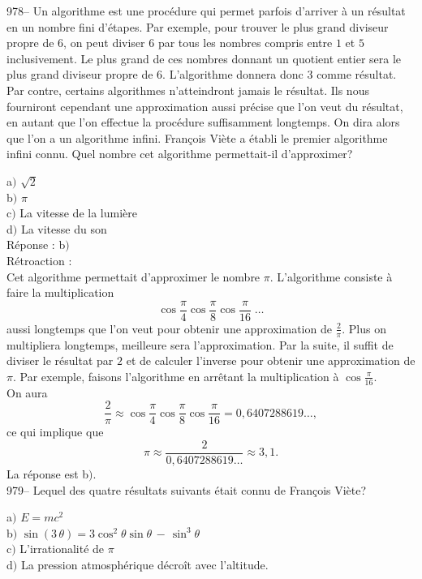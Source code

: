 ﻿\documentclass[letterpaper, 12pt]{article}
\begin{document}
978-- Un algorithme est une proc\'edure qui permet parfois d'arriver
\`a un r\'esultat en un nombre fini d'\'etapes. Par exemple, pour
trouver le plus grand diviseur propre de $6$, on peut diviser $6$
par tous les nombres compris entre $1$ et $5$ inclusivement. Le plus
grand de ces nombres donnant un quotient entier sera le plus grand
diviseur propre de $6$. L'algorithme donnera donc $3$ comme
r\'esultat. Par contre, certains algorithmes n'atteindront jamais le
r\'esultat. Ils nous fourniront cependant une approximation aussi
pr\'ecise que l'on veut du r\'esultat, en autant que l'on effectue
la proc\'edure suffisamment longtemps. On dira alors que l'on a un
algorithme infini. Fran\c cois Vi\`ete a \'etabli le premier
algorithme infini connu. Quel nombre cet algorithme permettait-il
d'approximer?

a$)$ $\sqrt2$ \\
b$)$ $\pi$ \\
c$)$ La vitesse de la lumi\`ere \\
d$)$ La vitesse du son\\

R\'eponse : b$)$\\

R\'etroaction : \\
Cet algorithme permettait d'approximer le nombre $\pi$. L'algorithme
consiste \`a faire la multiplication
$$\displaystyle{\cos\frac{\pi}4\cos\frac{\pi}8\cos\frac{\pi}{16}\;\ldots}$$
aussi longtemps que l'on veut pour obtenir une approximation de
$\frac2{\pi}$. Plus on multipliera longtemps, meilleure sera
l'approximation. Par la suite, il suffit de diviser le r\'esultat
par $2$ et de calculer l'inverse
pour obtenir une approximation de $\pi$. Par exemple, faisons l'algorithme
en arr\^etant la multiplication \`a $\cos\frac{\pi}{16}$.\\
On aura
$$
\displaystyle{\frac2{\pi}}  \approx
\displaystyle{\cos\frac{\pi}4\cos\frac{\pi}8\cos\frac{\pi}{16}}
                               =     0,640 728 861 9\ldots,
$$
ce qui implique que
$$
\pi  \approx  \displaystyle{\frac2{0,640 728 861 9\ldots}}
     \approx  3,1.
$$
La r\'eponse est b$)$.\\

979-- Lequel des quatre r\'esultats suivants \'etait connu de Fran\c
cois Vi\`ete?

a$)$ $E=mc^2$\\
b$)$ $\sin(3\,\theta)=3\cos^2\theta\sin\theta\,-\,\sin^3\theta$ \\
c$)$ L'irrationalit\'e de $\pi$ \\
d$)$ La pression atmosph\'erique d\'ecro\^it avec l'altitude.\\
\end{document}
